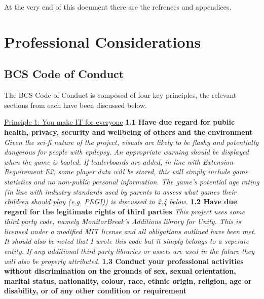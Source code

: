 \documentclass{report}
\begin{document}
 At the very end of this document there are the refrences and appendices.

\chapter{Professional Considerations}

\section{BCS Code of Conduct}

The BCS Code of Conduct \cite{bcs} is composed of four key principles, the relevant sections from each have been discussed below.
\newline
\newline
\begin{raggedright}
{\Large \underline{Principle 1: You make IT for everyone}}
\newline
\newline
\textbf{1.1 Have due regard for public health, privacy, security and wellbeing of others and the environment}
\newline
\newline
\textit{Given the sci-fi nature of the project, visuals are likely to be flashy and potentially dangerous for people with epilepsy. An appropriate warning should be displayed when the game is booted. If leaderboards are added, in line with Extension Requirement E2, some player data will be stored, this will simply include game statistics and no non-public personal information. The game's potential age rating (in line with industry standards used by parents to assess what games their children should play (e.g. PEGI)) is discussed in 2.4 below.}
\newline
\newline
\textbf{1.2 Have due regard for the legitimate rights of third parties}
\newline
\newline
\textit{This project uses some third party code, namely MonitorBreak's Additions library for Unity. This is licensed under a modified MIT license\cite{additionsLicense} and all obligations outlined have been met. It should also be noted that I wrote this code but it simply belongs to a seperate entity.
If any additional third party libraries or assets are used in the future they will also be properly attributed.}
\newline
\newline
\textbf{1.3 Conduct your professional activities without discrimination on the grounds of sex, sexual orientation, marital status, nationality, colour, race, ethnic origin, religion, age or disability, or of any other condition or requirement}

\end{raggedright}
\end{document}
